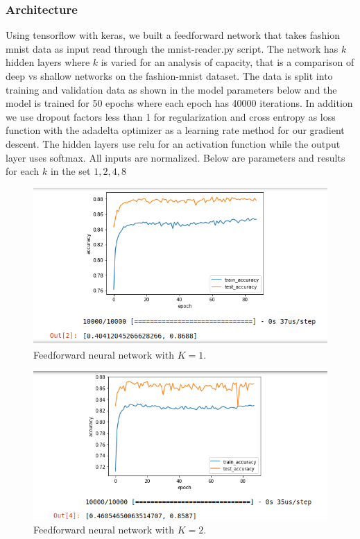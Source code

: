 \documentclass[titlepage]{article}
\begin{document}
\subsubsection{Architecture}
\par Using tensorflow with keras, we built a feedforward network that takes fashion mnist data as input read through the mnist-reader.py script. The network has $k$ hidden layers where $k$ is varied for an analysis of capacity, that is a comparison of deep vs shallow networks on the fashion-mnist dataset. The data is split into training and validation data as shown in the model parameters below and the model is trained for 50 epochs where each epoch has 40000 iterations. In addition we use dropout factors less than 1 for regularization and cross entropy as loss function with the adadelta optimizer as a learning rate method for our gradient descent. The hidden layers use relu for an activation function while the output layer uses softmax. All inputs are normalized. Below are parameters and results for each $k$ in the set ${1,2,4,8}$
\begin{figure}[H]
	\centering
	\includegraphics[width=1.0\textwidth]{1b.png}
	\caption{Feedforward neural network with $K = 1$.}
\end{figure}
\begin{figure}[H]
	\centering
	\includegraphics[width=1.0\textwidth]{2b.png}
	\caption{Feedforward neural network with $K = 2$.}
\end{figure}
\end{document}
